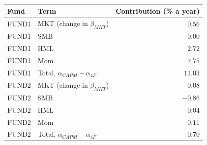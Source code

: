 \begin{tabular}{llr}
\toprule
Fund & Term & Contribution (\% a year) \\
\midrule
FUND1 & MKT (change in $\beta_{MKT}$) & $0.56$ \\
FUND1 & SMB & $0.00$ \\
FUND1 & HML & $2.72$ \\
FUND1 & Mom & $7.75$ \\
FUND1 & Total, $\alpha_{CAPM}-\alpha_{4F}$ & $11.03$ \\
FUND2 & MKT (change in $\beta_{MKT}$) & $0.08$ \\
FUND2 & SMB & $-0.86$ \\
FUND2 & HML & $-0.04$ \\
FUND2 & Mom & $0.11$ \\
FUND2 & Total, $\alpha_{CAPM}-\alpha_{4F}$ & $-0.70$ \\
\bottomrule
\end{tabular}
